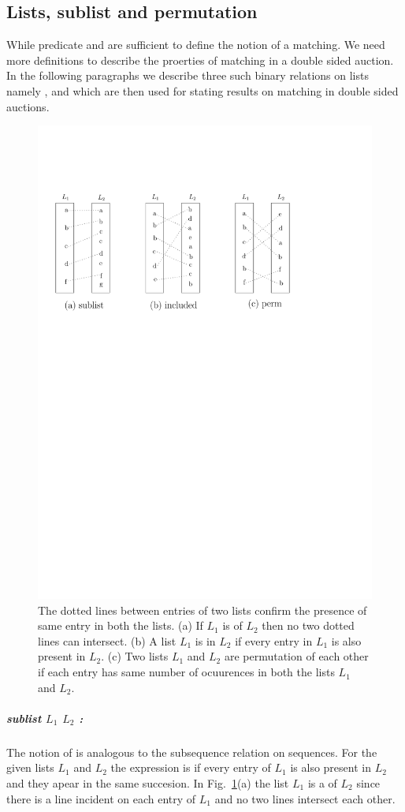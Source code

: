 \documentclass[a4paper,UKenglish,cleveref, autoref]{lipics-v2019}
\begin{document}
\subsection*{Lists, sublist and permutation}
While predicate  and    are sufficient to define the notion of a matching. We need more definitions to describe the proerties of matching in a double sided auction.  In the following paragraphs we describe three such binary relations on lists namely ,  and  which are then used for stating  results on matching in double sided auctions. 

\begin{figure}[h!]
\centering
\includegraphics[width=.6\textwidth]{sub_inclu_perm.pdf}
\caption{The dotted lines between entries of two lists confirm the presence of same entry in both the lists. (a) If $L_1$ is  of $L_2$ then no two dotted lines can intersect. (b) A list $L_1$ is  in $L_2$ if every entry in $L_1$ is also present in $L_2$. (c) Two lists $L_1$ and $L_2$ are permutation of each other if each entry has same number of ocuurences in both the lists $L_1$ and $L_2$. }
\label{fig:list}
\end{figure}

\subparagraph*{sublist $L_1$ $L_2$ :} The notion of   is analogous to the subsequence relation on sequences. For the given lists $L_1$ and $L_2$ the expression   is   if every entry of $L_1$ is also present in $L_2$ and they apear in the same succesion.  In Fig.~\ref{fig:list}(a) the list $L_1$ is a  of $L_2$ since there is a line incident on each entry of $L_1$ and no two lines intersect each other. 
\end{document}

